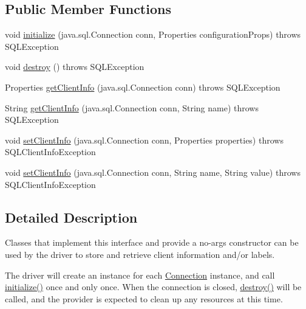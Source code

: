 \subsection*{Public Member Functions}
\begin{DoxyCompactItemize}
\item 
void \mbox{\hyperlink{interfacecom_1_1mysql_1_1jdbc_1_1_j_d_b_c4_client_info_provider_a6101402e08a2e2062be166fce41ffd71}{initialize}} (java.\+sql.\+Connection conn, Properties configuration\+Props)  throws S\+Q\+L\+Exception
\item 
void \mbox{\hyperlink{interfacecom_1_1mysql_1_1jdbc_1_1_j_d_b_c4_client_info_provider_affe0c92bcc9885faf204401f221fed76}{destroy}} ()  throws S\+Q\+L\+Exception
\item 
Properties \mbox{\hyperlink{interfacecom_1_1mysql_1_1jdbc_1_1_j_d_b_c4_client_info_provider_a7e0893a815f6b668deec04d40d60e985}{get\+Client\+Info}} (java.\+sql.\+Connection conn)  throws S\+Q\+L\+Exception
\item 
String \mbox{\hyperlink{interfacecom_1_1mysql_1_1jdbc_1_1_j_d_b_c4_client_info_provider_ab96958315c2fc129db072cfca9bd9547}{get\+Client\+Info}} (java.\+sql.\+Connection conn, String name)  throws S\+Q\+L\+Exception
\item 
void \mbox{\hyperlink{interfacecom_1_1mysql_1_1jdbc_1_1_j_d_b_c4_client_info_provider_ac2ed3391acf830bcb04941654e2cefe3}{set\+Client\+Info}} (java.\+sql.\+Connection conn, Properties properties)  throws S\+Q\+L\+Client\+Info\+Exception
\item 
void \mbox{\hyperlink{interfacecom_1_1mysql_1_1jdbc_1_1_j_d_b_c4_client_info_provider_ac4916282e520bf06380444e4703ae389}{set\+Client\+Info}} (java.\+sql.\+Connection conn, String name, String value)  throws S\+Q\+L\+Client\+Info\+Exception
\end{DoxyCompactItemize}


\subsection{Detailed Description}
Classes that implement this interface and provide a no-\/args constructor can be used by the driver to store and retrieve client information and/or labels.

The driver will create an instance for each \mbox{\hyperlink{interfacecom_1_1mysql_1_1jdbc_1_1_connection}{Connection}} instance, and call \mbox{\hyperlink{interfacecom_1_1mysql_1_1jdbc_1_1_j_d_b_c4_client_info_provider_a6101402e08a2e2062be166fce41ffd71}{initialize()}} once and only once. When the connection is closed, \mbox{\hyperlink{interfacecom_1_1mysql_1_1jdbc_1_1_j_d_b_c4_client_info_provider_affe0c92bcc9885faf204401f221fed76}{destroy()}} will be called, and the provider is expected to clean up any resources at this time. 

